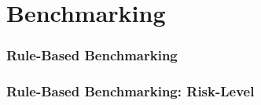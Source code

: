 \documentclass{beamer}
\begin{document}
\section{Benchmarking}


\begin{frame}
  \frametitle{Rule-Based Benchmarking}
\end{frame}


\begin{frame}
  \frametitle{Rule-Based Benchmarking: Risk-Level}
\end{frame}
\end{document}
